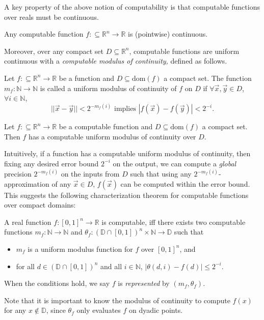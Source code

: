 \documentclass[prodmode]{acmsmall} %
\newcommand{\dom}{\mathrm{dom}}
\begin{document}
A key property of the above notion of computability is that computable functions over reals must be continuous.
\begin{theorem}
Any computable function $f:\subseteq \mathbb{R}^n\rightarrow \mathbb{R}$ is (pointwise) continuous.
\end{theorem}

Moreover, over any compact set $D\subseteq \mathbb{R}^n$, computable functions are uniform continuous with a {\em computable modulus of continuity,} defined as follows. 

\begin{definition}
Let $f:\subseteq \mathbb{R}^n\rightarrow \mathbb{R}$ be a function and $D\subseteq\dom(f)$ a compact set. The function $m_f: \mathbb{N}\rightarrow \mathbb{N}$ is called a uniform modulus of continuity of $f$ on $D$ if $\forall \vec x,\vec y\in D$, $\forall i\in \mathbb{N}$,
$$||\vec x-\vec y||<2^{-m_f(i)}\mbox{ implies }|f(\vec x)-f(\vec y)|<2^{-i}.$$
\end{definition}

\begin{theorem}
Let $f:\subseteq\mathbb{R}^n\rightarrow \mathbb{R}$ be a computable function and $D\subseteq\dom(f)$ a compact set. Then $f$ has a computable uniform modulus of continuity over $D$.
\end{theorem}
Intuitively, if a function has a computable uniform modulus of continuity, then fixing any desired error bound $2^{-i}$ on the output, we can compute a {\em global} precision $2^{-m_f(i)}$ on the inputs from $D$ such that using any $2^{-m_f(i)}$-approximation of any $\vec x\in D$, $f(\vec x)$ can be computed within the error bound. This suggests the following characterization theorem for computable functions over compact domains:
\begin{theorem}
\label{ch}
A real function $f: [0,1]^n\rightarrow \mathbb{R}$ is computable, iff there exists two computable functions $m_f:\mathbb{N}\rightarrow \mathbb{N}$ and $\theta_f: (\mathbb{D}\cap [0,1])^n\times \mathbb{N}\rightarrow \mathbb{D}$ such that
\begin{itemize}
\item $m_f$ is a uniform modulus function for $f$ over $[0,1]^n$, and
\item for all $d\in (\mathbb{D}\cap [0,1])^n$ and all $i\in \mathbb{N}$, $|\theta(d, i)- f(d)|\leq 2^{-i}$. 
\end{itemize}
When the conditions hold, we say $f$ is {\em represented} by $(m_f,\theta_f)$. 
\end{theorem}
Note that it is important to know the modulus of continuity to compute $f(x)$ for any $x\not\in \mathbb{D}$, since $\theta_f$ only evaluates $f$ on dyadic points.
\end{document}
